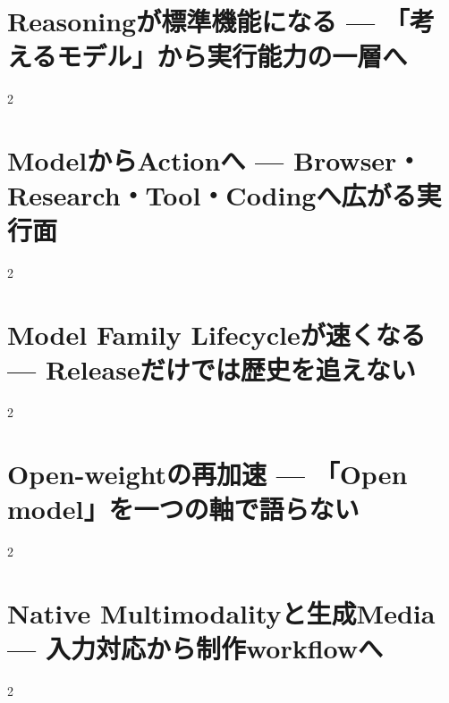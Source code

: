 \documentclass[lualatex,a4paper,11pt]{jlreq}
\begin{document}
\surveycover
\clearpage


\clearpage
\section{Reasoningが標準機能になる — 「考えるモデル」から実行能力の一層へ}
\label{pkg:reasoning}

\medskip
\begin{multicols}{2}

\end{multicols}


\Needspace{0.45\textheight}
\bigskip
\section{ModelからActionへ — Browser・Research・Tool・Codingへ広がる実行面}
\label{pkg:agents}

\medskip
\begin{multicols}{2}

\end{multicols}


\Needspace{0.45\textheight}
\bigskip
\section{Model Family Lifecycleが速くなる — Releaseだけでは歴史を追えない}
\label{pkg:lifecycle}

\medskip
\begin{multicols}{2}

\end{multicols}


\Needspace{0.45\textheight}
\bigskip
\section{Open-weightの再加速 — 「Open model」を一つの軸で語らない}
\label{pkg:open}

\medskip
\begin{multicols}{2}

\end{multicols}


\Needspace{0.45\textheight}
\bigskip
\section{Native Multimodalityと生成Media — 入力対応から制作workflowへ}
\label{pkg:multimodal}

\medskip
\begin{multicols}{2}

\end{multicols}

\end{document}
